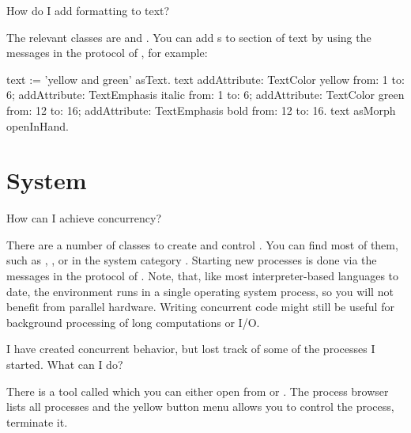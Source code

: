 \documentclass[a4paper,10pt,twoside]{book}
\begin{document}
\begin{faq}
How do I add formatting to text?
\end{faq}
\answer
The relevant classes are  and . 
You can add s to section of text by using the messages in the  protocol of , for example:
\begin{code}{}
text := 'yellow and green' asText.
text 
	addAttribute: TextColor yellow from: 1 to: 6;
	addAttribute: TextEmphasis italic from: 1 to: 6;
	addAttribute: TextColor green from: 12 to: 16;
	addAttribute: TextEmphasis bold from: 12 to: 16.
text asMorph openInHand.
\end{code}  

\section{System}

\begin{faq}
How can I achieve concurrency?
\end{faq}
\answer
There are a number of classes to create and control .
You can find most of them, such as , , or  in the system category .
Starting new processes is done via the messages in the  protocol of .
Note, that, like most interpreter-based languages to date, the \sq environment runs in a single operating system process, so you will not benefit from parallel hardware.
Writing concurrent code might still be useful for background processing of long computations or I/O.

\begin{faq}
I have created concurrent behavior, but lost track of some of the processes I started. 
What can I do?
\end{faq}
\answer
There is a tool called  which you can either open from  or . 
The process browser lists all processes and the yellow button menu allows you to control the process, \eg terminate it.
\end{document}
